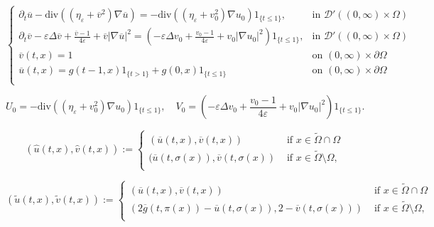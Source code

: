 \documentclass[10pt,a4paper]{amsart}
\begin{document}
\begin{equation}\label{extension uv eq}
\left\{\begin{array}{ll}
\partial_t \overline{u} - \text{div}((\eta_\varepsilon + \overline{v}^2) \nabla \overline{u}) = - \text{div}((\eta_\varepsilon + v_0^2) \nabla u_0) 1_{\{t\leqslant 1\}}, &\text{in } \mathcal{D}'((0,\infty)\times\Omega)\\
\partial_t \overline{v} - \varepsilon \Delta \overline{v} + \frac{\overline{v}-1}{4\varepsilon} + \overline{v}|\nabla \overline{u}|^2 = (- \varepsilon \Delta v_0 + \frac{v_0-1}{4\varepsilon} + v_0|\nabla u_0|^2)1_{\{t\leqslant 1\}},  &\text{in } \mathcal{D}'((0,\infty)\times \Omega)\\
\overline{v}(t,x) = 1 & \text{on } (0,\infty) \times \partial\Omega \\
\overline{u}(t,x) = g(t-1,x)1_{\{t > 1\}} + g(0,x) 1_{\{t\leqslant 1\}} & \text{on } (0,\infty) \times \partial\Omega\\
\end{array}\right. 
\end{equation}

\begin{equation}\label{def U0 V0}
U_0 = - \text{div}((\eta_\varepsilon + v_0^2) \nabla u_0) 1_{\{t\leqslant 1\}}, \quad V_0 = \left(- \varepsilon \Delta v_0 + \frac{v_0-1}{4\varepsilon} + v_0|\nabla u_0|^2\right)1_{\{t\leqslant 1\}}.
\end{equation}

\begin{equation}\label{def : u chapeau}
(\hat{u}(t,x),\hat{v}(t,x))  := \left\{ \begin{array}{ll}
(\overline{u}(t,x), \overline{v}(t,x))  & \text{ if } x\in \widetilde{\Omega} \cap \Omega \\
(\overline{u} (t,\sigma (x)), \overline{v} (t,\sigma(x)) & \text{ if } x\in \widetilde{\Omega} \setminus \Omega,\\
\end{array} \right.
\end{equation}

\begin{equation}\label{def : u tilde}
(\widetilde{u}(t,x), \widetilde{v}(t,x)) := \left\{ \begin{array}{ll}
(\overline{u} (t,x), \overline{v}(t,x)) & \text{ if } x\in \widetilde{\Omega} \cap \Omega \\
(2 \overline{g}(t,\pi(x))- \overline{u} (t,\sigma (x)), 2-\overline{v}(t,\sigma(x))) & \text{ if } x\in \widetilde{\Omega} \setminus \Omega,\\
\end{array} \right.
\end{equation}
\end{document}
